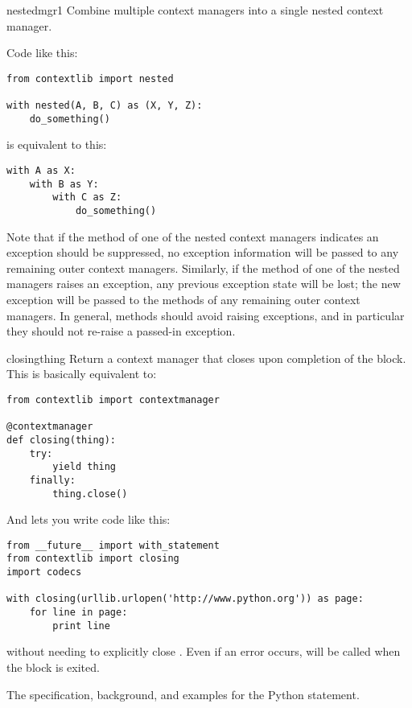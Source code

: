 \begin{funcdesc}{nested}{mgr1}
Combine multiple context managers into a single nested context manager.

Code like this:

\begin{verbatim}
from contextlib import nested

with nested(A, B, C) as (X, Y, Z):
    do_something()
\end{verbatim}

is equivalent to this:

\begin{verbatim}
with A as X:
    with B as Y:
        with C as Z:
            do_something()
\end{verbatim}

Note that if the  method of one of the nested
context managers indicates an exception should be suppressed, no
exception information will be passed to any remaining outer context
managers. Similarly, if the  method of one of the
nested managers raises an exception, any previous exception state will
be lost; the new exception will be passed to the
 methods of any remaining outer context managers.
In general,  methods should avoid raising
exceptions, and in particular they should not re-raise a
passed-in exception.
\end{funcdesc}

\label{context-closing}
\begin{funcdesc}{closing}{thing}
Return a context manager that closes  upon completion of
the block.  This is basically equivalent to:

\begin{verbatim}
from contextlib import contextmanager

@contextmanager
def closing(thing):
    try:
        yield thing
    finally:
        thing.close()
\end{verbatim}

And lets you write code like this:
\begin{verbatim}
from __future__ import with_statement
from contextlib import closing
import codecs

with closing(urllib.urlopen('http://www.python.org')) as page:
    for line in page:
        print line
\end{verbatim}

without needing to explicitly close .  Even if an error
occurs,  will be called when the 
block is exited.
\end{funcdesc}

\begin{seealso}
         {The specification, background, and examples for the
          Python  statement.}
\end{seealso}
